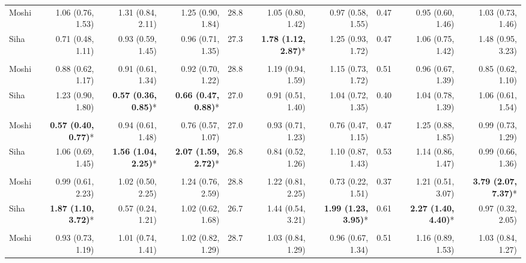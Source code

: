 \begin{table}[t]
\begin{tabular*}{\linewidth}{@{\extracolsep{\fill}}l|rrrrrrrrr}
\midrule\addlinespace[2.5pt]
\multicolumn{10}{l}{Caries} \\[2.5pt] 
\midrule\addlinespace[2.5pt]
Moshi & 1.06 (0.76, 1.53) & 1.31 (0.84, 2.11) & 1.25 (0.90, 1.84) & 28.8 & 1.05 (0.80, 1.42) & 0.97 (0.58, 1.55) & 0.47 & 0.95 (0.60, 1.46) & 1.03 (0.73, 1.46) \\ 
Siha & 0.71 (0.48, 1.11) & 0.93 (0.59, 1.45) & 0.96 (0.71, 1.35) & 27.3 & \textbf{1.78 (1.12, 2.87)}* & 1.25 (0.93, 1.72) & 0.47 & 1.06 (0.75, 1.42) & 1.48 (0.95, 3.23) \\ 
\midrule\addlinespace[2.5pt]
\multicolumn{10}{l}{Poisoning} \\[2.5pt] 
\midrule\addlinespace[2.5pt]
Moshi & 0.88 (0.62, 1.17) & 0.91 (0.61, 1.34) & 0.92 (0.70, 1.22) & 28.8 & 1.19 (0.94, 1.59) & 1.15 (0.73, 1.72) & 0.51 & 0.96 (0.67, 1.39) & 0.85 (0.62, 1.10) \\ 
Siha & 1.23 (0.90, 1.80) & \textbf{0.57 (0.36, 0.85)}* & \textbf{0.66 (0.47, 0.88)}* & 27.0 & 0.91 (0.51, 1.40) & 1.04 (0.72, 1.35) & 0.40 & 1.04 (0.78, 1.39) & 1.06 (0.61, 1.54) \\ 
\midrule\addlinespace[2.5pt]
\multicolumn{10}{l}{Snake and Insect Bites} \\[2.5pt] 
\midrule\addlinespace[2.5pt]
Moshi & \textbf{0.57 (0.40, 0.77)}* & 0.94 (0.61, 1.48) & 0.76 (0.57, 1.07) & 27.0 & 0.93 (0.71, 1.23) & 0.76 (0.47, 1.15) & 0.47 & 1.25 (0.88, 1.85) & 0.99 (0.73, 1.29) \\ 
Siha & 1.06 (0.69, 1.45) & \textbf{1.56 (1.04, 2.25)}* & \textbf{2.07 (1.59, 2.72)}* & 26.8 & 0.84 (0.52, 1.26) & 1.10 (0.87, 1.43) & 0.53 & 1.14 (0.86, 1.47) & 0.99 (0.66, 1.36) \\ 
\midrule\addlinespace[2.5pt]
\multicolumn{10}{l}{Substance Abuse} \\[2.5pt] 
\midrule\addlinespace[2.5pt]
Moshi & 0.99 (0.61, 2.23) & 1.02 (0.50, 2.25) & 1.24 (0.76, 2.59) & 28.8 & 1.22 (0.81, 2.25) & 0.73 (0.22, 1.51) & 0.37 & 1.21 (0.51, 3.07) & \textbf{3.79 (2.07, 7.37)}* \\ 
Siha & \textbf{1.87 (1.10, 3.72)}* & 0.57 (0.24, 1.21) & 1.02 (0.62, 1.68) & 26.7 & 1.44 (0.54, 3.21) & \textbf{1.99 (1.23, 3.95)}* & 0.61 & \textbf{2.27 (1.40, 4.40)}* & 0.97 (0.32, 2.05) \\ 
\midrule\addlinespace[2.5pt]
\multicolumn{10}{l}{Fractures} \\[2.5pt] 
\midrule\addlinespace[2.5pt]
Moshi & 0.93 (0.73, 1.19) & 1.01 (0.74, 1.41) & 1.02 (0.82, 1.29) & 28.7 & 1.03 (0.84, 1.29) & 0.96 (0.67, 1.34) & 0.51 & 1.16 (0.89, 1.53) & 1.03 (0.84, 1.27) \\ 

\end{tabular*}
\end{table}
